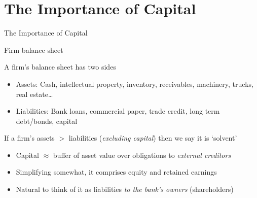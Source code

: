 \section{The Importance of Capital}

\begin{frame}

\begin{center}
{\LARGE The Importance of Capital}
\end{center}

\end{frame}



\begin{frame}{Firm balance sheet}

A firm's balance sheet has two sides
	\begin{itemize}
	\item	Assets: Cash, intellectual property, inventory, receivables, machinery, trucks, real estate\ldots
	\item	Liabilities: Bank loans, commercial paper, trade credit, long term debt/bonds, capital
	\end{itemize}
\vspace{2mm}
If a firm's assets $>$ liabilities (\emph{excluding capital}) then we say it is `solvent'
	\begin{itemize}
	\item	Capital $\approx$ buffer of asset value over obligations to \textit{external creditors}
	\item	Simplifying somewhat, it comprises equity and retained earnings
	\item	Natural to think of it as liabilities \textit{to the bank's owners} (shareholders)
	\end{itemize}

\end{frame}



